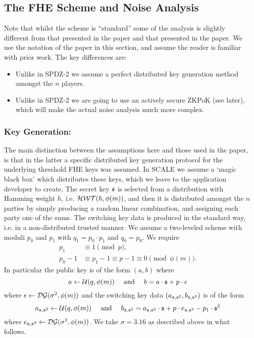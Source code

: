 \subsection{The FHE Scheme and Noise Analysis}
Note that whilst the scheme is ``standard'' some of the
analysis is slightly different from that presented in the \cite{SPDZ2} paper 
and that presented in the \cite{GHS12c} paper.
We use the notation of the \cite{SPDZ2} paper in this section,
and assume the reader is familiar with prior work.
The key differences are:
\begin{itemize}
\item Unlike in SPDZ-2 we assume a perfect distributed key generation method
amongst the $n$ players.
\item Unlike in SPDZ-2 we are going to use an actively secure ZKPoK (see later),
which will make the actual noise analysis much more complex.
\end{itemize}


\subsubsection{Key Generation:}
The main distinction between the assumptions here and those used in 
the \cite{SPDZ2} paper, is that in the latter a specific distributed 
key generation protocol for the underlying threshold FHE keys was
assumed. In SCALE we assume a `magic black box' which distributes
these keys, which we leave to the application developer to create.
The secret key $\mathfrak{s}$ is selected from a distribution with
Hamming weight $h$, i.e. $\mathcal{HWT}(h,\phi(m))$, 
and then it is distributed amongst the $n$ parties by simply producing a random 
linear combination, and assigning each party one of the sums.
The switching key data is produced in the standard way, i.e.
in a non-distributed trusted manner.
We assume a two-leveled scheme with moduli $p_0$ and $p_1$ with $q_1=p_0 \cdot p_1$
and $q_0=p_0$.
We require 
\begin{align*}
   p_1 & \equiv 1 \pmod{p}, \\
   p_0 - 1 & \equiv p_1-1 \equiv p-1 \equiv 0 \pmod{\phi(m)}.
\end{align*}
In particular the public key is of the form $(a,b)$ where
\[ a \leftarrow \mathcal{U}(q,\phi(m)) \quad \mbox{ and } \quad b = a \cdot \mathfrak{s} + p \cdot \epsilon \]
where $\epsilon \leftarrow \mathcal{DG}(\sigma^2,\phi(m))$ 
and the switching key data $(a_{\mathfrak{s},\mathfrak{s}^2},b_{\mathfrak{s},\mathfrak{s}^2})$ is of the form
\[ a_{\mathfrak{s},\mathfrak{s}^2} \leftarrow \mathcal{U}(q,\phi(m)) \quad \mbox{ and } \quad 
   b_{\mathfrak{s},\mathfrak{s}^2} =   a_{\mathfrak{s},\mathfrak{s}^2} \cdot \mathfrak{s} + p \cdot e_{\mathfrak{s},\mathfrak{s}^2} - p_1 \cdot \mathfrak{s}^2 \]
where $e_{\mathfrak{s},\mathfrak{s}^2} \leftarrow \mathcal{DG}(\sigma^2,\phi(m))$.
We take $\sigma=3.16$ as described above in what follows.

